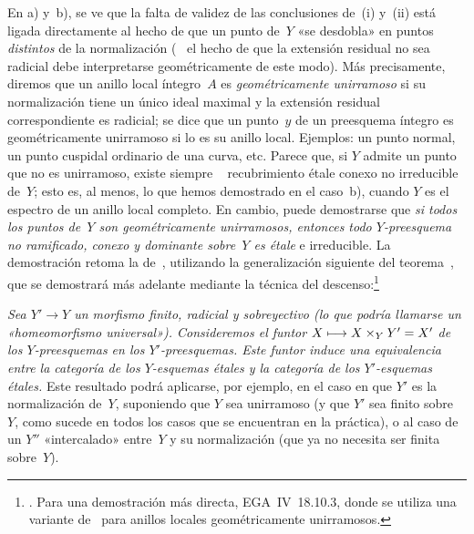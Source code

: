 En a) y~b), se ve que la falta de validez de las conclusiones de~\ptbl\textup{(i)} y~\textup{(ii)} está ligada directamente al hecho de que un punto de~$Y$ «se desdobla» en puntos \emph{distintos} de la normalización (\ %
el hecho de que la extensión residual no sea radicial debe interpretarse geométricamente de este modo). Más precisamente, diremos que un anillo local íntegro~$A$ es \emph{geométricamente unirramoso}
%
%
si su normalización tiene un único ideal maximal y la extensión residual correspondiente es radicial; se dice que un punto~$y$ de un preesquema íntegro es geométricamente unirramoso si lo es su anillo local. Ejemplos: un punto normal, un punto cuspidal ordinario de una curva, etc. Parece que, si $Y$ admite un punto que no es unirramoso, existe siempre
\ %
recubrimiento étale conexo no irreducible de~$Y$; esto es, al menos, lo que hemos demostrado en el caso~b), cuando $Y$ es el espectro de un anillo local completo. En cambio, puede demostrarse que \emph{si todos los puntos de~$Y$ son geométricamente unirramosos, entonces todo $Y$-preesquema no ramificado, conexo y dominante sobre~$Y$ es étale} e irreducible. La demostración retoma la de~, utilizando la generalización siguiente del teorema~, que se demostrará más adelante mediante la técnica del descenso:\footnote{\Cf {}. Para una demostración más directa, \cf EGA~IV~18.10.3, donde se utiliza una variante de~ para anillos locales geométricamente unirramosos.}

\emph{Sea $Y'\to Y$ un morfismo finito, radicial y sobreyectivo (\ie lo que podría llamarse un «homeomorfismo universal»). Consideremos el funtor $X\longmapsto X\times_YY'=X'$ de los $Y$-preesquemas en los $Y'$-preesquemas. Este funtor induce una equivalencia entre la categoría de los $Y$-esquemas étales y la categoría de los $Y'$-esquemas étales.} Este resultado podrá aplicarse, por ejemplo, en el caso en que $Y'$ es la normalización de~$Y$, suponiendo que $Y$ sea unirramoso (y que $Y'$ sea finito sobre~$Y$, como sucede en todos los casos que se encuentran en la práctica), o al caso de un $Y''$ «intercalado» entre~$Y$ y su normalización (que ya no necesita ser finita sobre~$Y$).
